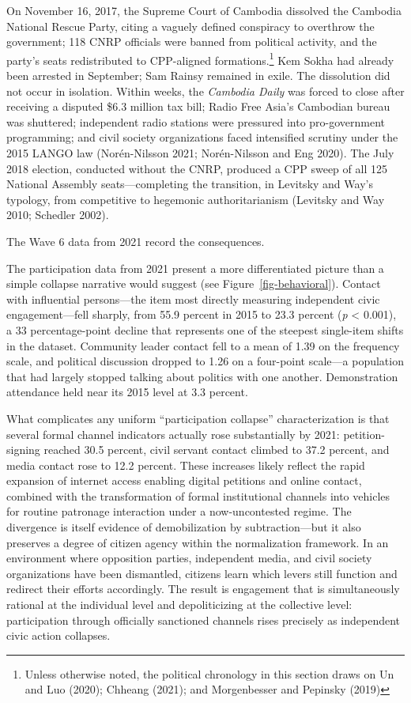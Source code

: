 \documentclass[
  12pt,
  letterpaper]{article}
\begin{document}
On November 16, 2017, the Supreme Court of Cambodia dissolved the
Cambodia National Rescue Party, citing a vaguely defined conspiracy to
overthrow the government; 118 CNRP officials were banned from political
activity, and the party's seats redistributed to CPP-aligned
formations.\footnote{Unless otherwise noted, the political chronology in
  this section draws on Un and Luo (2020); Chheang (2021); and
  Morgenbesser and Pepinsky (2019)} Kem Sokha had already been arrested
in September; Sam Rainsy remained in exile. The dissolution did not
occur in isolation. Within weeks, the \emph{Cambodia Daily} was forced
to close after receiving a disputed \$6.3 million tax bill; Radio Free
Asia's Cambodian bureau was shuttered; independent radio stations were
pressured into pro-government programming; and civil society
organizations faced intensified scrutiny under the 2015 LANGO law
(Norén-Nilsson 2021; Norén-Nilsson and Eng 2020). The July 2018
election, conducted without the CNRP, produced a CPP sweep of all 125
National Assembly seats---completing the transition, in Levitsky and
Way's typology, from competitive to hegemonic authoritarianism (Levitsky
and Way 2010; Schedler 2002).

The Wave 6 data from 2021 record the consequences.

The participation data from 2021 present a more differentiated picture
than a simple collapse narrative would suggest (see
Figure~\ref{fig-behavioral}). Contact with influential persons---the
item most directly measuring independent civic engagement---fell
sharply, from 55.9 percent in 2015 to 23.3 percent (\emph{p} \textless{}
0.001), a 33 percentage-point decline that represents one of the
steepest single-item shifts in the dataset. Community leader contact
fell to a mean of 1.39 on the frequency scale, and political discussion
dropped to 1.26 on a four-point scale---a population that had largely
stopped talking about politics with one another. Demonstration
attendance held near its 2015 level at 3.3 percent.

What complicates any uniform ``participation collapse'' characterization
is that several formal channel indicators actually rose substantially by
2021: petition-signing reached 30.5 percent, civil servant contact
climbed to 37.2 percent, and media contact rose to 12.2 percent. These
increases likely reflect the rapid expansion of internet access enabling
digital petitions and online contact, combined with the transformation
of formal institutional channels into vehicles for routine patronage
interaction under a now-uncontested regime. The divergence is itself
evidence of demobilization by subtraction---but it also preserves a
degree of citizen agency within the normalization framework. In an
environment where opposition parties, independent media, and civil
society organizations have been dismantled, citizens learn which levers
still function and redirect their efforts accordingly. The result is
engagement that is simultaneously rational at the individual level and
depoliticizing at the collective level: participation through officially
sanctioned channels rises precisely as independent civic action
collapses.
\end{document}
